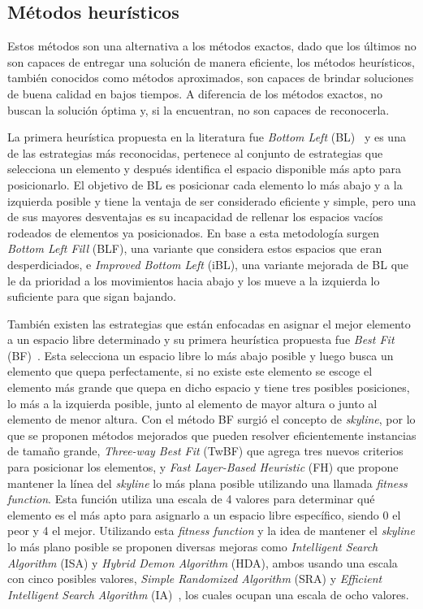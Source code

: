 \documentclass[letter, 10pt]{article}
\begin{document}
\subsection{M\'etodos heur\'isticos}

Estos m\'etodos son una alternativa a los m\'etodos exactos, dado que los \'ultimos no son capaces de entregar una soluci\'on de manera eficiente, los m\'etodos heur\'isticos, tambi\'en conocidos como m\'etodos aproximados, son capaces de brindar soluciones de buena calidad en bajos tiempos. A diferencia de los m\'etodos exactos, no buscan la soluci\'on \'optima y, si la encuentran, no son capaces de reconocerla.

La primera heur\'istica propuesta en la literatura fue \emph{Bottom Left} (BL)~\cite{oliveira2016survey} y es una de las estrategias m\'as reconocidas, pertenece al conjunto de estrategias que selecciona un elemento y despu\'es identifica el espacio disponible m\'as apto para posicionarlo. El objetivo de BL es posicionar cada elemento lo m\'as abajo y a la izquierda posible y tiene la ventaja de ser considerado eficiente y simple, pero una de sus mayores desventajas es su incapacidad de rellenar los espacios vac\'ios rodeados de elementos ya posicionados. En base a esta metodolog\'ia surgen \emph{Bottom Left Fill} (BLF), una variante que considera estos espacios que eran desperdiciados, e \emph{Improved Bottom Left} (iBL), una variante mejorada de BL que le da prioridad a los movimientos hacia abajo y los mueve a la izquierda lo suficiente para que sigan bajando. 

Tambi\'en existen las estrategias que est\'an enfocadas en asignar el mejor elemento a un espacio libre determinado y su primera heur\'istica propuesta fue \emph{Best Fit} (BF)~\cite{verstichel2013improved}. Esta selecciona un espacio libre lo m\'as abajo posible y luego busca un elemento que quepa perfectamente, si no existe este elemento se escoge el elemento m\'as grande que quepa en dicho espacio y tiene tres posibles posiciones, lo m\'as a la izquierda posible, junto al elemento de mayor altura o junto al elemento de menor altura. Con el m\'etodo BF surgi\'o el concepto de \emph{skyline}, por lo que se proponen m\'etodos mejorados que pueden resolver eficientemente instancias de tama\~no grande, \emph{Three-way Best Fit} (TwBF) que agrega tres nuevos criterios para posicionar los elementos, y \emph{Fast Layer-Based Heuristic} (FH) que propone mantener la l\'inea del \emph{skyline} lo m\'as plana posible utilizando una llamada \emph{fitness function}. Esta funci\'on utiliza una escala de 4 valores para determinar qu\'e elemento es el m\'as apto para asignarlo a un espacio libre espec\'ifico, siendo 0 el peor y 4 el mejor. Utilizando esta \emph{fitness function} y la idea de mantener el \emph{skyline} lo m\'as plano posible se proponen diversas mejoras como \emph{Intelligent Search Algorithm} (ISA) y \emph{Hybrid Demon Algorithm} (HDA), ambos usando una escala con cinco posibles valores, \emph{Simple Randomized Algorithm} (SRA) y \emph{Efficient Intelligent Search Algorithm} (IA)~\cite{wei2016efficient}, los cuales ocupan una escala de ocho valores.
\end{document}
